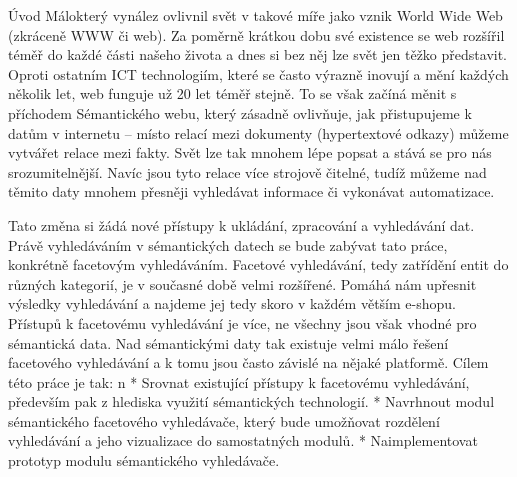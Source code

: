 \chap Úvod
Málokterý vynález ovlivnil svět v takové míře jako vznik World Wide Web (zkráceně WWW či web). Za poměrně krátkou dobu své existence se web rozšířil téměř do každé části našeho života a dnes si bez něj 
lze svět jen těžko představit. Oproti ostatním ICT technologiím, které se často výrazně inovují a mění každých několik let, web funguje už 20 let téměř stejně.
To se však začíná měnit s příchodem Sémantického webu, který zásadně ovlivňuje, jak přistupujeme k datům v internetu – místo relací mezi dokumenty (hypertextové odkazy) můžeme vytvářet relace mezi fakty. 
Svět lze tak mnohem lépe popsat a stává se pro nás srozumitelnější. Navíc jsou tyto relace více strojově čitelné, tudíž můžeme nad těmito daty mnohem přesněji vyhledávat informace či vykonávat automatizace. 


Tato změna si žádá nové přístupy k ukládání, zpracování a vyhledávání dat. Právě vyhledáváním v sémantických datech se bude zabývat tato práce, konkrétně facetovým vyhledáváním. Facetové vyhledávání, tedy 
zatřídění entit do různých kategorií, je v současné době velmi rozšířené. Pomáhá nám upřesnit výsledky vyhledávání a najdeme jej tedy skoro v každém větším e-shopu. Přístupů k facetovému vyhledávání je více, ne 
všechny jsou však vhodné pro sémantická data. Nad sémantickými daty tak existuje velmi málo řešení facetového vyhledávání a k tomu jsou často závislé na nějaké platformě.
Cílem této práce je tak:
\begitems \style n
* Srovnat existující přístupy k facetovému vyhledávání, především pak z hlediska využití sémantických technologií.
* Navrhnout modul sémantického facetového vyhledávače, který bude umožňovat rozdělení vyhledávání a jeho vizualizace do samostatných modulů.
* Naimplementovat prototyp modulu sémantického vyhledávače.
\enditems